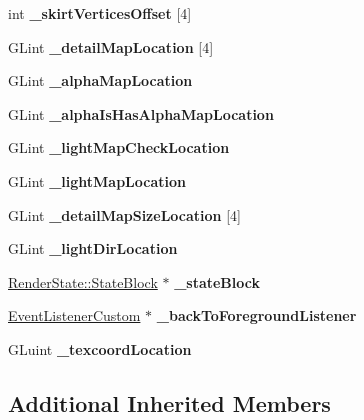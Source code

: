\begin{DoxyCompactItemize}
int {\bfseries \+\_\+skirt\+Vertices\+Offset} \mbox{[}4\mbox{]}
\item 
\mbox{\label{classTerrain_a549b9200c6088e4b953c8b569af22f43}} 
G\+Lint {\bfseries \+\_\+detail\+Map\+Location} \mbox{[}4\mbox{]}
\item 
\mbox{\label{classTerrain_afee14a66d8b947e52fe902fc2f150c3c}} 
G\+Lint {\bfseries \+\_\+alpha\+Map\+Location}
\item 
\mbox{\label{classTerrain_ab60973b54d2658395bed2899279557bd}} 
G\+Lint {\bfseries \+\_\+alpha\+Is\+Has\+Alpha\+Map\+Location}
\item 
\mbox{\label{classTerrain_a2c3cc6eddeff2cdc9a1a52b125ed67e4}} 
G\+Lint {\bfseries \+\_\+light\+Map\+Check\+Location}
\item 
\mbox{\label{classTerrain_a081acfa2a2a28d675dd7e85c075ab40e}} 
G\+Lint {\bfseries \+\_\+light\+Map\+Location}
\item 
\mbox{\label{classTerrain_afcde7c519ba21ceeb4163722132ae748}} 
G\+Lint {\bfseries \+\_\+detail\+Map\+Size\+Location} \mbox{[}4\mbox{]}
\item 
\mbox{\label{classTerrain_ac66c3a52d59d5ed39da78b4abd9e4211}} 
G\+Lint {\bfseries \+\_\+light\+Dir\+Location}
\item 
\mbox{\label{classTerrain_a5a19de1ae8a88bdc511b1962ae7f108f}} 
\hyperlink{classRenderState_1_1StateBlock}{Render\+State\+::\+State\+Block} $\ast$ {\bfseries \+\_\+state\+Block}
\item 
\mbox{\label{classTerrain_a17b15a725d1ca26ba2fbae93a19d32e0}} 
\hyperlink{classEventListenerCustom}{Event\+Listener\+Custom} $\ast$ {\bfseries \+\_\+back\+To\+Foreground\+Listener}
\item 
\mbox{\label{classTerrain_ac21a7d8d34713e6a9b79b34cf9fce75a}} 
G\+Luint {\bfseries \+\_\+texcoord\+Location}
\end{DoxyCompactItemize}
\subsection*{Additional Inherited Members}


